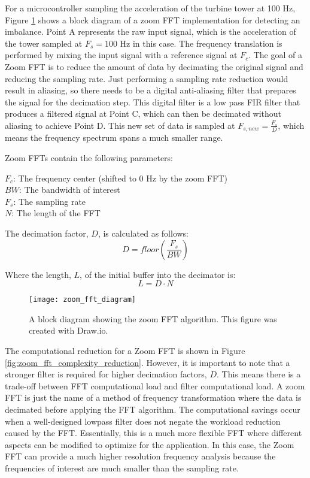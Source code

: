 For a microcontroller sampling the acceleration of the turbine tower at 100 Hz, Figure \ref{fig:zoom_fft_diagram} shows a block diagram of a zoom FFT implementation for detecting an imbalance.  Point A represents the raw input signal, which is the acceleration of the tower sampled at $F_s=100$ Hz in this case.  The frequency translation is performed by mixing the input signal with a reference signal at $F_c$.  The goal of a Zoom FFT is to reduce the amount of data by decimating the original signal and reducing the sampling rate.  Just performing a sampling rate reduction would result in aliasing, so there needs to be a digital anti-aliasing filter that prepares the signal for the decimation step.  This digital filter is a low pass FIR filter that produces a filtered signal at Point C, which can then be decimated without aliasing to achieve Point D.  This new set of data is sampled at $F_{s,new}=\frac{F_s}{D}$, which means the frequency spectrum spans a much smaller range.

Zoom FFTs \cite{zoom_fft_ref} contain the following parameters:

$F_c$: The frequency center (shifted to 0 Hz by the zoom FFT) \\
$BW$: The bandwidth of interest \\
$F_s$: The sampling rate \\
$N$: The length of the FFT

The decimation factor, $D$, is calculated as follows:
$$D = floor\left(\frac{F_s}{BW}\right)$$

Where the length, $L$, of the initial buffer into the decimator is:
$$L=D \cdot N$$

\begin{figure}
	\centering
	\texttt{[image: zoom\_fft\_diagram]}
	\decoRule
	\caption{A block diagram showing the zoom FFT algorithm. This figure was created with Draw.io.}
	\label{fig:zoom_fft_diagram}
\end{figure}

The computational reduction for a Zoom FFT is shown in Figure \ref{fig:zoom_fft_complexity_reduction}.  However, it is important to note that a stronger filter is required for higher decimation factors, $D$.  This means there is a trade-off between FFT computational load and filter computational load.  A zoom FFT is just the name of a method of frequency transformation where the data is decimated before applying the FFT algorithm.  The computational savings occur when a well-designed lowpass filter does not negate the workload reduction caused by the FFT.  Essentially, this is a much more flexible FFT where different aspects can be modified to optimize for the application.  In this case, the Zoom FFT can provide a much higher resolution frequency analysis because the frequencies of interest are much smaller than the sampling rate.


